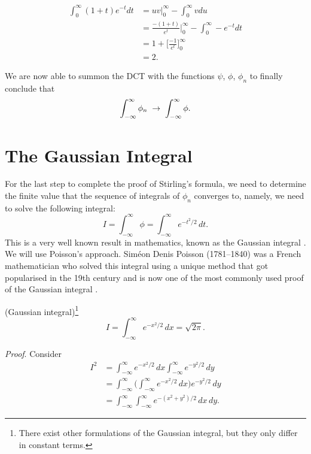 \documentclass[12pt]{article}
\begin{document}
\begin{align*}
    \int_0^\infty (1+t)e^{-t}dt&= uv\bigg|_0^\infty-\int_0^\infty vdu\\
&=\frac{-(1+t)}{e^t}\bigg|_0^\infty-\int_0^\infty-e^{-t}dt\\
&=1+\bigg[\frac{-1}{e^t}\bigg]_0^\infty\\
&=2.
\end{align*}

\noindent We are now able to summon the DCT with the functions $\psi$, $\phi$, $\phi_n$ to finally conclude that $$\int_{-\infty}^\infty \phi_n\hspace{1mm}\to\hspace{1mm}\int_{-\infty}^\infty\phi.$$

\vspace{4mm}


\section{The Gaussian Integral}

\noindent For the last step to complete the proof of Stirling's formula, we need to determine the finite value that the sequence of integrals of $\phi_n$ converges to, namely, we need to solve the following integral: $$I=\int_{-\infty}^\infty\phi=\int_{-\infty}^\infty e^{-t^2/2}\,dt.$$ This is a very well known result in mathematics, known as the Gaussian integral \cite{r9}. We will use Poisson's approach. Siméon Denis Poisson (1781--1840) was a French mathematician who solved this integral using a unique method that got popularised in the 19th century and is now one of the most commonly used proof of the Gaussian integral \cite{r10}. 

\vspace{5mm}

 (Gaussian integral)\footnote{There exist other formulations of the Gaussian integral, but they only differ in constant terms.}$$I=\int_{-\infty}^\infty e^{-x^2/2}\,dx=\sqrt{2\pi}.$$

\newpage

\noindent\textit{Proof}. Consider 
\begin{align*}
    I^2&=\int_{-\infty}^\infty e^{-x^2/2}\,dx\int_{-\infty}^\infty e^{-y^2/2}\,dy\\
    &=\int_{-\infty}^\infty \bigg(\int_{-\infty}^\infty e^{-x^2/2}\,dx\bigg)e^{-y^2/2}\,dy\\
    &=\int_{-\infty}^\infty\int_{-\infty}^\infty e^{-(x^2+y^2)/2}\,dx\,dy.
\end{align*}
\end{document}
